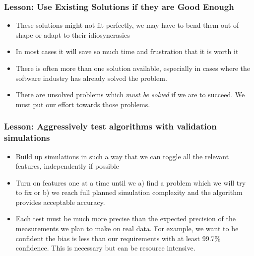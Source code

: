 \documentclass{beamer}
\begin{document}
\frame
{
    \frametitle{Lesson: Use Existing Solutions if they are Good Enough}


    \begin{itemize}

        \item These solutions might not fit perfectly, we may have to bend
            them out of shape or adapt to their idiosyncrasies

        \item In most cases it will save so much time and frustration that it
            is worth it

        \item There is often more than one solution available, especially in
            cases where the software industry has already solved the problem.

        \item There are unsolved problems which {\em must be solved} if we are
            to succeed.  We must put our effort towards those problems.

    \end{itemize}

}

\frame
{
    \frametitle{Lesson: Aggressively test algorithms with validation simulations}


    \begin{itemize}

        \item Build up simulations in such a way that we can toggle all the
            relevant features, independently if possible

        \item Turn on features one at a time until we a) find a problem which we
            will try to fix or b) we reach full planned simulation complexity
            and the algorithm provides acceptable accuracy.

        \item Each test must be much more precise than the expected precision
            of the measurements we plan to make on real data.  For example, we
            want to be confident the bias is less than our requirements with at
            least 99.7\% confidence.  This is necessary but can be resource
            intensive.

    \end{itemize}

}
\end{document}
